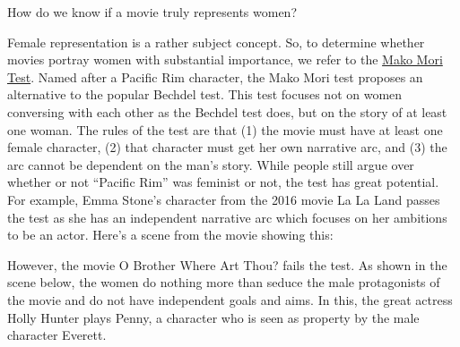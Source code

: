\documentclass[ignorenonframetext,]{beamer}
\begin{document}
\begin{frame}{How do we know if a movie truly represents women?}

Female representation is a rather subject concept. So, to determine
whether movies portray women with substantial importance, we refer to
the
\href{www.dailydot.com/parsec/fandom/mako-mori-test-bechdel-pacific-rim/}{Mako
Mori Test}. Named after a Pacific Rim character, the Mako Mori test
proposes an alternative to the popular Bechdel test. This test focuses
not on women conversing with each other as the Bechdel test does, but on
the story of at least one woman. The rules of the test are that (1) the
movie must have at least one female character, (2) that character must
get her own narrative arc, and (3) the arc cannot be dependent on the
man's story. While people still argue over whether or not ``Pacific
Rim'' was feminist or not, the test has great potential. For example,
Emma Stone's character from the 2016 movie La La Land passes the test as
she has an independent narrative arc which focuses on her ambitions to
be an actor. Here's a scene from the movie showing this:

However, the movie O Brother Where Art Thou? fails the test. As shown in
the scene below, the women do nothing more than seduce the male
protagonists of the movie and do not have independent goals and aims. In
this, the great actress Holly Hunter plays Penny, a character who is
seen as property by the male character Everett.

\end{frame}
\end{document}

